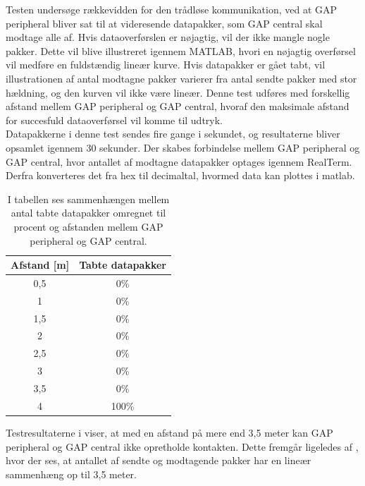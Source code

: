 Testen undersøge rækkevidden for den trådløse kommunikation, ved at GAP peripheral bliver sat til at videresende datapakker, som GAP central skal modtage alle af. Hvis dataoverførslen er nøjagtig, vil der ikke mangle nogle pakker. Dette vil blive illustreret igennem MATLAB, hvori en nøjagtig overførsel vil medføre en fuldstændig lineær kurve. Hvis datapakker er gået tabt, vil illustrationen af antal modtagne pakker varierer fra antal sendte pakker med stor hældning, og den kurven vil ikke være lineær. Denne test udføres med forskellig afstand mellem GAP peripheral og GAP central, hvoraf den maksimale afstand for succesfuld dataoverførsel vil komme til udtryk. \\
Datapakkerne i denne test sendes fire gange i sekundet, og resultaterne bliver opsamlet igennem 30 sekunder. Der skabes forbindelse mellem GAP peripheral og GAP central, hvor antallet af modtagne datapakker optages igennem RealTerm. Derfra konverteres det fra hex til decimaltal, hvormed data kan plottes i matlab.
\begin{table}[H]
	\centering
	\begin{tabular}{cc}
			\hline
		\rowcolor[HTML]{C0C0C0} 
		Afstand {[}m{]} & Tabte datapakker \\ 	\hline
		0,5 	& 0\% \\ 	\hline
		1 		& 0\% \\	\hline
		1,5 	& 0\% \\	\hline
		2 		& 0\% \\	\hline
		2,5 	& 0\% \\	\hline
		3 		& 0\% \\	\hline
		3,5 	& 0\% \\	\hline
		4 		& 100\% \\	\hline
	\end{tabular}
	\caption{I tabellen ses sammenhængen mellem antal tabte datapakker omregnet til procent og afstanden mellem GAP peripheral og GAP central.}
	\label{test:ble_overforsel}
\end{table} \vspace{-.5cm}
Testresultaterne i  viser, at med en afstand på mere end 3,5 meter kan GAP peripheral og GAP central ikke opretholde kontakten. Dette fremgår ligeledes af , hvor der ses, at antallet af sendte og modtagende pakker har en lineær sammenhæng op til 3,5 meter.
